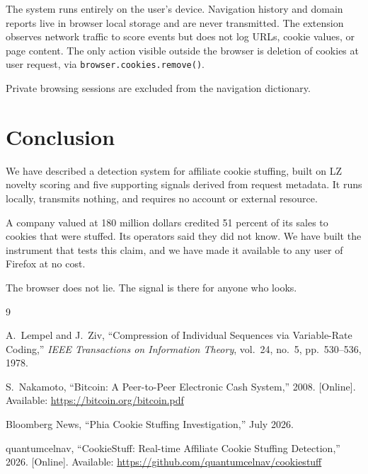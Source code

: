 \documentclass[10pt,twocolumn,letterpaper]{article}
\begin{document}
The system runs entirely on the user's device. Navigation history and domain
reports live in browser local storage and are never transmitted. The
extension observes network traffic to score events but does not log URLs,
cookie values, or page content. The only action visible outside the browser
is deletion of cookies at user request, via \texttt{browser.cookies.remove()}.

Private browsing sessions are excluded from the navigation dictionary.

\section{Conclusion}

We have described a detection system for affiliate cookie stuffing, built on
LZ novelty scoring and five supporting signals derived from request metadata.
It runs locally, transmits nothing, and requires no account or external
resource.

A company valued at 180 million dollars credited 51 percent of its sales to
cookies that were stuffed. Its operators said they did not know. We have built
the instrument that tests this claim, and we have made it available to any
user of Firefox at no cost.

The browser does not lie. The signal is there for anyone who looks.

\begin{thebibliography}{9}

  A.~Lempel and J.~Ziv,
  ``Compression of Individual Sequences via Variable-Rate Coding,''
  \textit{IEEE Transactions on Information Theory}, vol.~24, no.~5,
  pp.~530--536, 1978.

  S.~Nakamoto,
  ``Bitcoin: A Peer-to-Peer Electronic Cash System,''
  2008. [Online]. Available: \url{https://bitcoin.org/bitcoin.pdf}

  Bloomberg News,
  ``Phia Cookie Stuffing Investigation,''
  July 2026.

  quantumcelnav,
  ``CookieStuff: Real-time Affiliate Cookie Stuffing Detection,''
  2026. [Online]. Available: \url{https://github.com/quantumcelnav/cookiestuff}

\end{thebibliography}
\end{document}
